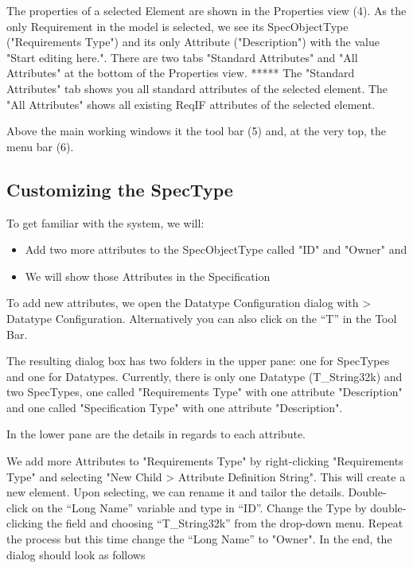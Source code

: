 The properties of a selected Element are shown in the Properties view (4).  As the only Requirement in the model is selected, we see its SpecObjectType ("Requirements Type") and its only Attribute ("Description") with the value "Start editing here.".  There are two tabs "Standard Attributes" and "All Attributes" at the bottom of the Properties view.  ***** The "Standard Attributes" tab shows you all standard attributes of the selected element.  The "All Attributes" shows all existing ReqIF attributes of the selected element.

Above the main working windows it the tool bar (5) and, at the very top, the menu bar (6).

\subsection{Customizing the SpecType}

To get familiar with the system, we will:

\begin{itemize}

\item
  Add two more attributes to the SpecObjectType called "ID" and "Owner" and
\item
  We will show those Attributes in the Specification
\end{itemize}

To add new attributes, we open the Datatype Configuration dialog with \pror{} \textgreater{} Datatype Configuration.  Alternatively you can also click on the ``T'' in the Tool Bar.

The resulting dialog box has two folders in the upper pane: one for SpecTypes and one for Datatypes.  Currently, there is only one Datatype (T\_String32k) and two SpecTypes, one called "Requirements Type" with one attribute "Description" and one called "Specification Type" with one attribute "Description".

In the lower pane are the details in regards to each attribute.

We add more Attributes to "Requirements Type" by right-clicking "Requirements Type" and selecting "New Child \textgreater{} Attribute Definition String".  This will create a new element.  Upon selecting, we can rename it and tailor the details.  Double-click on the ``Long Name'' variable and type in ``ID''.  Change the Type by double-clicking the field and choosing ``T\_String32k'' from the drop-down menu.  Repeat the process but this time change the ``Long Name'' to "Owner".  In the end, the dialog should look as follows

